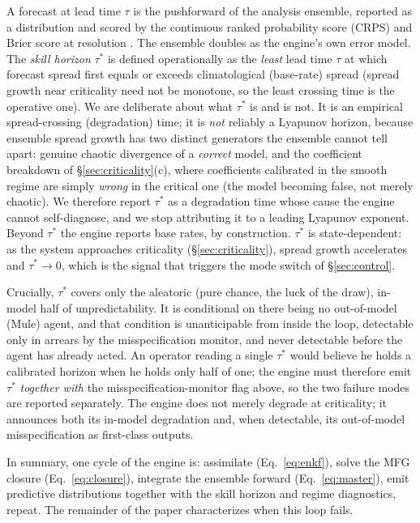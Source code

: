 \documentclass[11pt]{article}
\begin{document}
A forecast at lead time $\tau$ is the pushforward of the analysis ensemble, reported as a distribution and scored by the continuous ranked probability score (CRPS) and Brier score at resolution \cite{tetlock2015}. The ensemble doubles as the engine's own error model. The \emph{skill horizon} $\tau^\ast$ is defined operationally as the \emph{least} lead time $\tau$ at which forecast spread first equals or exceeds climatological (base-rate) spread (spread growth near criticality need not be monotone, so the least crossing time is the operative one). We are deliberate about what $\tau^\ast$ is and is not. It is an empirical spread-crossing (degradation) time; it is \emph{not} reliably a Lyapunov horizon, because ensemble spread growth has two distinct generators the ensemble cannot tell apart: genuine chaotic divergence of a \emph{correct} model, and the coefficient breakdown of \S\ref{sec:criticality}(c), where coefficients calibrated in the smooth regime are simply \emph{wrong} in the critical one (the model becoming false, not merely chaotic). We therefore report $\tau^\ast$ as a degradation time whose cause the engine cannot self-diagnose, and we stop attributing it to a leading Lyapunov exponent. Beyond $\tau^\ast$ the engine reports base rates, by construction. $\tau^\ast$ is state-dependent: as the system approaches criticality (\S\ref{sec:criticality}), spread growth accelerates and $\tau^\ast \to 0$, which is the signal that triggers the mode switch of \S\ref{sec:control}.

Crucially, $\tau^\ast$ covers only the aleatoric (pure chance, the luck of the draw), in-model half of unpredictability. It is conditional on there being no out-of-model (Mule) agent, and that condition is unanticipable from inside the loop, detectable only in arrears by the misspecification monitor, and never detectable before the agent has already acted. An operator reading a single $\tau^\ast$ would believe he holds a calibrated horizon when he holds only half of one; the engine must therefore emit $\tau^\ast$ \emph{together with} the misspecification-monitor flag above, so the two failure modes are reported separately. The engine does not merely degrade at criticality; it announces both its in-model degradation and, when detectable, its out-of-model misspecification as first-class outputs.

In summary, one cycle of the engine is: assimilate (Eq.~\ref{eq:enkf}), solve the MFG closure (Eq.~\ref{eq:closure}), integrate the ensemble forward (Eq.~\ref{eq:master}), emit predictive distributions together with the skill horizon and regime diagnostics, repeat. The remainder of the paper characterizes when this loop fails.
\end{document}
